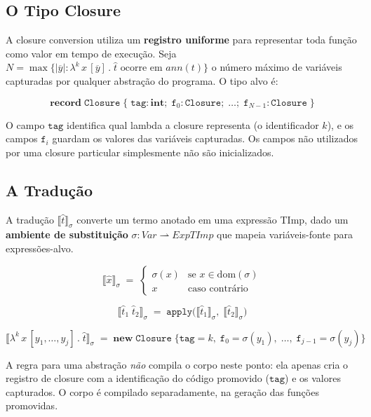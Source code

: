 \subsection{O Tipo Closure}

A closure conversion utiliza um \textbf{registro uniforme} para
representar toda função como valor em tempo de execução. Seja
\(N = \max\{|\overline{y}| : \lambda^k\, x\,[\overline{y}]\,.\;\hat{t}
\text{ ocorre em } \mathit{ann}(t)\}\) o número máximo de variáveis
capturadas por qualquer abstração do programa. O tipo alvo é:

\[
  \mathbf{record}\;\mathtt{Closure}\;\{
    \;\mathtt{tag} : \mathbf{int};\;
    \mathtt{f}_0 : \mathtt{Closure};\;
    \ldots;\;
  \mathtt{f}_{N-1} : \mathtt{Closure}\;\}
\]

O campo \(\mathtt{tag}\) identifica qual lambda a closure representa
(o identificador \(k\)), e os campos \(\mathtt{f}_i\) guardam os
valores das variáveis capturadas. Os campos não utilizados por uma
closure particular simplesmente não são inicializados.

\subsection{A Tradução}

A tradução \(\llbracket \hat{t}\rrbracket_\sigma\) converte um termo
anotado em uma expressão TImp, dado um \textbf{ambiente de
substituição} \(\sigma : \mathit{Var} \rightharpoonup
\mathit{ExpTImp}\) que mapeia variáveis-fonte para expressões-alvo.

\[
  \llbracket \hat{x} \rrbracket_\sigma \;=\;
  \begin{cases}
    \sigma(x) & \text{se } x \in \mathrm{dom}(\sigma) \\
    x         & \text{caso contrário}
  \end{cases}
\]

\[
  \llbracket \hat{t}_1\; \hat{t}_2 \rrbracket_\sigma \;=\;
  \mathtt{apply}\bigl(\llbracket \hat{t}_1 \rrbracket_\sigma,\;
  \llbracket \hat{t}_2 \rrbracket_\sigma\bigr)
\]

\[
  \llbracket \lambda^k\, x\,[y_1,\ldots,y_j]\,.\;\hat{t}
  \rrbracket_\sigma \;=\;
  \mathbf{new}\;\mathtt{Closure}\;\bigl\{
    \mathtt{tag} = k,\;
    \mathtt{f}_0 = \sigma(y_1),\;
    \ldots,\;
    \mathtt{f}_{j-1} = \sigma(y_j)
  \bigr\}
\]

A regra para uma abstração \emph{não} compila o corpo neste ponto: ela
apenas cria o registro de closure com a identificação do código
promovido (\(\mathtt{tag}\)) e os valores capturados. O corpo é
compilado separadamente, na geração das funções promovidas.


